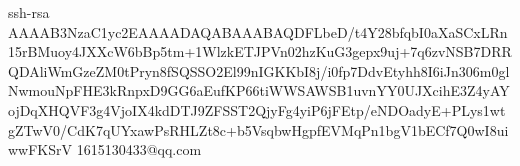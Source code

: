 ssh-rsa AAAAB3NzaC1yc2EAAAADAQABAAABAQDFLbeD/t4Y28bfqbI0aXaSCxLRn15rBMuoy4JXXcW6bBp5tm+1WlzkETJPVn02hzKuG3gepx9uj+7q6zvNSB7DRRQDAliWmGzeZM0tPryn8fSQSSO2El99nIGKKbI8j/i0fp7DdvEtyhh8I6iJn306m0glNwmouNpFHE3kRnpxD9GG6aEufKP66tiWWSAWSB1uvnYY0UJXcihE3Z4yAYojDqXHQVF3g4VjoIX4kdDTJ9ZFSST2QjyFg4yiP6jFEtp/eNDOadyE+PLys1wtgZTwV0/CdK7qUYxawPsRHLZt8c+b5VsqbwHgpfEVMqPn1bgV1bECf7Q0wI8uiwwFKSrV 1615130433@qq.com